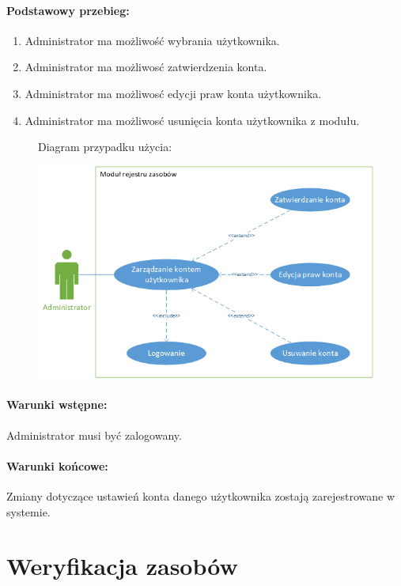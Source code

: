 \documentclass[11pt, a4paper, oneside]{report}
\begin{document}
\paragraph{Podstawowy przebieg:}
\begin{enumerate}
\item Administrator ma możliwość wybrania użytkownika.
\item Administrator ma możliwosć zatwierdzenia konta.
\item Administrator ma możliwosć edycji praw konta użytkownika.
\item Administrator ma możliwosć usunięcia konta użytkownika z modułu.
\end{enumerate}

\begin{figure}[H]
Diagram przypadku użycia:

\centering
\includegraphics[scale=1]{Zarzadzanie_kontem.png}
\end{figure}

\paragraph{Warunki wstępne:} Administrator musi być zalogowany.
\paragraph{Warunki końcowe:} Zmiany dotyczące ustawień konta danego użytkownika zostają zarejestrowane w systemie.

\section{Weryfikacja zasobów}
\end{document}
